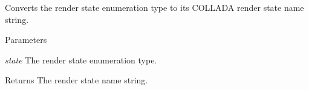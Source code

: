 \label{namespaceFUDaePassState_a94b3bb7dbf36218b3e730b6929e31b08}
Converts the render state enumeration type to its COLLADA render state name string. 
\begin{DoxyParams}{Parameters}
\item[{\em state}]The render state enumeration type. \end{DoxyParams}
\begin{DoxyReturn}{Returns}
The render state name string. 
\end{DoxyReturn}
